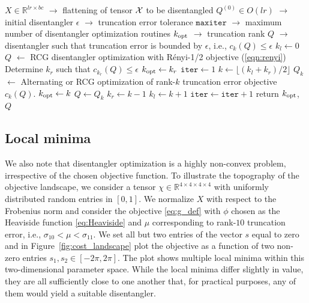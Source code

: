 \documentclass[pdflatex,sn-mathphys-num]{sn-jnl}
\newcounter{thm}[section]
\begin{document}
\begin{algorithm}[htbp] \label{alg:bisection}
 \caption{Binary search rank selection and disentangler optimization} 
\begin{algorithmic}[1]
\Require 
\Statex $X \in \mathbb{R}^{lr \times bc}$ $\rightarrow$ flattening of tensor ${\cal X}$ to be disentangled
\Statex $Q^{(0)} \in O(lr)$ $\rightarrow$ initial disentangler
\Statex $\epsilon$ $\rightarrow$ truncation error tolerance 
\Statex $\texttt{maxiter}$ $\rightarrow$ maximum number of disentangler optimization routines
\Ensure
\Statex $k_{\rm opt}$ $\rightarrow$ truncation rank
\Statex $Q$ $\rightarrow$ disentangler such that truncation error is bounded by $\epsilon$, i.e., $c_k(Q) \leq \epsilon$
%
\State $k_l \leftarrow 0$
\State $Q$ $\leftarrow$ RCG disentangler optimization with Rényi-1/2 objective (\ref{eqn:renyi})
\State Determine $k_r$ such that $c_{k_r}(Q) \leq \epsilon$ 
\State $k_{\rm opt} \leftarrow k_r$
\State $\texttt{iter} \leftarrow 1$
\State $k \leftarrow \lfloor(k_l +
k_r)/2 \rfloor$
\State $Q_k$ $\leftarrow$ Alternating or RCG optimization of rank-$k$ truncation error objective $c_{k}(Q)$. 
    \State $k_{\rm opt} \leftarrow k$
    \State $Q \leftarrow Q_k$
    \State $k_r \leftarrow k - 1$
\Else
    \State $k_l \leftarrow k + 1$
\EndIf
\State $\texttt{iter} \leftarrow \texttt{iter} + 1$
\EndWhile
\State return $k_{\rm opt}$, $Q$
\end{algorithmic}
\end{algorithm}

\subsection{Local minima}
We also note that disentangler optimization is a highly non-convex problem, irrespective of the chosen objective function. To illustrate the topography of the objective landscape, we consider a tensor $\chi \in \mathbb{R}^{4\times 4\times 4 \times 4}$ with uniformly distributed random entries in $[0,1]$. We normalize $X$ with respect to the Frobenius norm and consider the objective \eqref{eq:g_def} with $\phi$ chosen as the Heaviside function \eqref{eq:Heaviside} and $\mu$ corresponding to rank-$10$ truncation error, i.e.,  $\sigma_{10} < \mu < \sigma_{11}$. We set all but two entries of the vector $s$ equal to zero and in Figure~\ref{fig:cost_landscape} plot the objective as a function of two non-zero entries $s_1,s_2 \in [-2\pi,2\pi]$. The plot shows multiple local minima within this two-dimensional parameter space. While the local minima differ slightly in value, they are all sufficiently close to one another that, for practical purposes, any of them would yield a suitable disentangler. 
\end{document}
